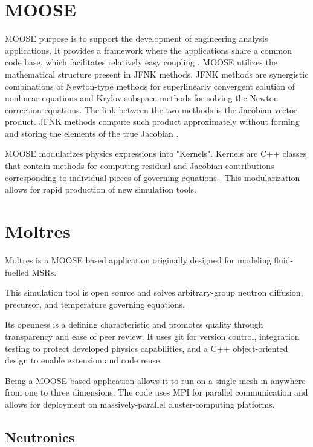 \documentclass[11pt,letterpaper]{article}
\begin{document}
\section{MOOSE}

\gls{MOOSE} purpose is to support the development of engineering analysis applications.
It provides a framework where the applications share a common code base, which facilitates relatively easy coupling \cite{novak_pronghorn_2018}.
\gls{MOOSE} utilizes the mathematical structure present in \gls{JFNK} methods.
\gls{JFNK} methods are synergistic combinations of Newton-type methods for superlinearly convergent solution of nonlinear equations and Krylov subspace methods for solving the Newton correction equations.
The link between the two methods is the Jacobian-vector product.
\gls{JFNK} methods compute such product approximately without forming and storing the elements of the true Jacobian \cite{knoll_jacobian-free_2004}.

\gls{MOOSE} modularizes physics expressions into "Kernels".
Kernels are C++ classes that contain methods for computing residual and Jacobian contributions corresponding to individual pieces of governing equations \cite{lindsay_introduction_2018}.
This modularization allows for rapid production of new simulation tools.

\section{Moltres}

Moltres \cite{lindsay_introduction_2018} is a \gls{MOOSE} based application originally designed for modeling fluid-fuelled \glspl{MSR}.

This simulation tool is open source and solves arbitrary-group neutron diffusion, precursor, and temperature governing equations.

Its openness is a defining characteristic and promotes quality through transparency and ease of peer review.
It uses git for version control, integration testing to protect developed physics capabilities, and a C++ object-oriented design to enable extension and code reuse.

Being a \gls{MOOSE} based application allows it to run on a single mesh in anywhere from one to three dimensions.
The code uses MPI for parallel communication and allows for deployment on massively-parallel cluster-computing platforms.

\subsection{Neutronics}
\end{document}
